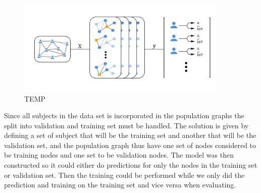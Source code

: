 \begin{figure}[H]
    \includegraphics[width=0.9\textwidth]{chapters/images_methods/poptoy.png}
    \caption{TEMP}
    \label{fig:poptoy}
\end{figure}


Since all subjects in the data set is incorporated in the population graphs the split into validation and training set must be handled. The solution is given by defining a set of subject that will be the training set and another that will be the validation set, and the population graph thus have one set of nodes considered to be training nodes and one set to be validation nodes. The model was then constructed so it could either do predictions for only the nodes in the training set or validation set. Then the training could be performed while we only did the prediction and training on the training set and vice versa when evaluating.

